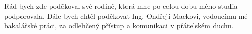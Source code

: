 \documentclass[11pt,twoside,a4paper]{book}
\begin{document}
	
	\translate				%

	

	\coverpagestarts


	\acknowledgements
	\noindent
	Rád bych zde poděkoval své rodině, která mne po celou dobu mého studia podporovala. Dále bych chtěl poděkovat Ing. Ondřeji Mackovi, vedoucímu mé bakalářské práci, za odlehčený přístup a komunikaci v přátelském duchu.





 
	\abstractpage
\end{document}
